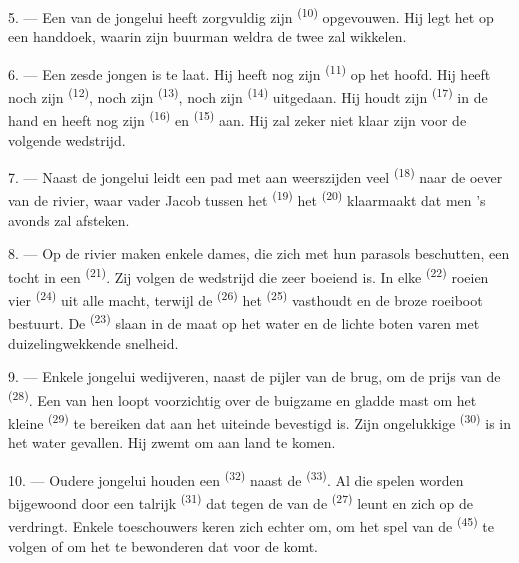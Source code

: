 5. --- Een van de jongelui heeft zorgvuldig zijn  \textsuperscript{(10)}
opgevouwen. Hij legt het op een handdoek, waarin zijn buurman weldra de twee
 zal wikkelen.

6. --- Een zesde jongen is te laat. Hij heeft nog zijn  \textsuperscript{(11)} op
het hoofd. Hij heeft noch zijn  \textsuperscript{(12)}, noch zijn 
\textsuperscript{(13)}, noch zijn  \textsuperscript{(14)} uitgedaan. Hij
houdt zijn
 \textsuperscript{(17)} in de hand en heeft nog zijn
 \textsuperscript{(16)} en 
\textsuperscript{(15)} aan. Hij zal zeker niet klaar zijn voor de volgende wedstrijd.

7. --- Naast de jongelui leidt een pad met aan weerszijden veel
 \textsuperscript{(18)} naar de oever van de rivier, waar vader
Jacob tussen het  \textsuperscript{(19)} het 
\textsuperscript{(20)} klaarmaakt dat men 's avonds zal afsteken.

\VUsaut{4.4mm}
\VUsaut{3.4mm}

8. --- Op de rivier maken enkele dames, die zich met hun parasols beschutten, een tocht in een
 \textsuperscript{(21)}. Zij volgen de wedstrijd die zeer boeiend is. In elke
 \textsuperscript{(22)} roeien vier
 \textsuperscript{(24)} uit alle macht, terwijl de
 \textsuperscript{(26)} het 
\textsuperscript{(25)} vasthoudt en de broze roeiboot bestuurt. De
 \textsuperscript{(23)} slaan in de maat op het water en de
lichte boten varen met duizelingwekkende snelheid.

9. --- Enkele jongelui wedijveren, naast de pijler van de brug, om de prijs van de
 \textsuperscript{(28)}. Een van hen loopt voorzichtig over de buigzame en
gladde mast om het kleine  \textsuperscript{(29)} te bereiken dat aan het
uiteinde bevestigd is. Zijn ongelukkige  \textsuperscript{(30)} is in het
water gevallen. Hij zwemt om aan land te komen.

10. --- Oudere jongelui houden een  \textsuperscript{(32)} naast
de  \textsuperscript{(33)}. Al die spelen worden bijgewoond door een talrijk
 \textsuperscript{(31)} dat tegen de  van de 
\textsuperscript{(27)} leunt en zich op de  verdringt. Enkele toeschouwers keren
zich echter om, om het spel van de  \textsuperscript{(45)} te volgen of om
het  te bewonderen dat voor de  komt.


